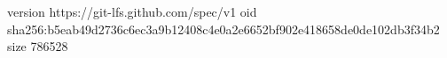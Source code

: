 version https://git-lfs.github.com/spec/v1
oid sha256:b5eab49d2736c6ec3a9b12408c4e0a2e6652bf902e418658de0de102db3f34b2
size 786528

